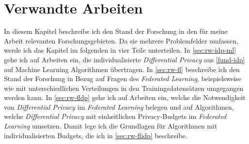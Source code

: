 \chapter{Verwandte Arbeiten}\label{chap:related-work}


In diesem Kapitel beschreibe ich den Stand der Forschung in den für meine Arbeit relevanten Forschungsgebieten. Da sie mehrere Problemfelder umfassen, werde ich das Kapitel im folgenden in vier Teile unterteilen. In \autoref{sec:rw-idp-ml} gehe ich auf Arbeiten ein, die individualisierte \textit{Differential Privacy} aus \autoref{fund-idp} auf Machine Learning Algorithmen übertragen. In \autoref{sec:rw-fl} beschreibe ich den Stand der Forschung in Bezug auf Fragen des \textit{Federated Learning}, beispielsweise wie mit unterschiedlichen Verteilungen in den Trainingsdatensätzen umgegangen werden kann. In \autoref{sec:rw-fldp} gehe ich auf Arbeiten ein, welche die Notwendigkeit von \textit{Differential Privacy} im \textit{Federated Learning} belegen und auf Algorithmen, welche \textit{Differential Privacy} mit einheitlichen Privacy-Budgets im \textit{Federated Learning} umsetzen. Damit lege ich die Grundlagen für Algorithmen mit individualisierten Budgets, die ich in \autoref{sec:rw-flidp} beschreibe.

